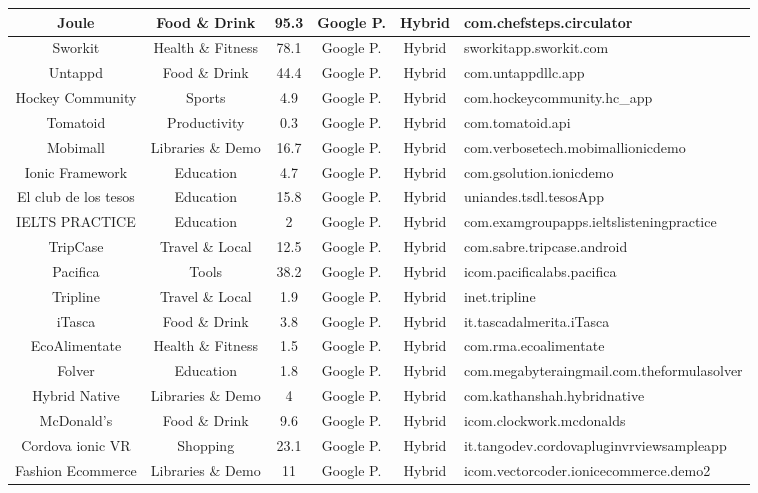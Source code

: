\begin{table}[t]
\begin{adjustbox}{width=\textwidth}
\begin{tabular}{|c|c|c|c|c|l|}
			Joule&Food \& Drink&95.3&Google P.&Hybrid&\small{com.chefsteps.circulator}\\ \hline
			Sworkit&Health \& Fitness&78.1&Google P.&Hybrid&\small{sworkitapp.sworkit.com}\\ \hline
			Untappd &Food \& Drink&44.4&Google P.&Hybrid&\small{com.untappdllc.app}\\ \hline
			Hockey Community&Sports&4.9&Google P.&Hybrid&\small{com.hockeycommunity.hc\_app}\\ \hline
			Tomatoid&Productivity&0.3&Google P.&Hybrid&\small{com.tomatoid.api}\\ \hline
			Mobimall&Libraries \& Demo&16.7&Google P.&Hybrid&\footnotesize{com.verbosetech.mobimall\textunderscore ionicdemo}\\ \hline
			Ionic Framework&Education&4.7&Google P.&Hybrid&\small{com.gsolution.ionicdemo}\\ \hline
			El club de los tesos&Education&15.8&Google P.&Hybrid&\small{uniandes.tsdl.tesosApp}\\ \hline
			IELTS PRACTICE&Education&2&Google P.&Hybrid&\footnotesize{com.examgroupapps.ieltslistening\textunderscore practice}\\ \hline
			TripCase &Travel \& Local&12.5&Google P.&Hybrid&\small{com.sabre.tripcase.android}\\ \hline
			Pacifica&Tools&38.2&Google P.&Hybrid&\small{icom.pacificalabs.pacifica}\\ \hline
			Tripline&Travel \& Local&1.9&Google P.&Hybrid&\small{inet.tripline}\\ \hline
			iTasca&Food \& Drink&3.8&Google P.&Hybrid&\small{it.tascadalmerita.iTasca}\\ \hline
			EcoAlimentate&Health \& Fitness&1.5&Google P.&Hybrid&\small{com.rma.ecoalimentate}\\ \hline
			Folver&Education&1.8&Google P.&Hybrid&\scriptsize{com.megabyteraingmail.com.theformulasolver}\\ \hline
			Hybrid Native&Libraries \& Demo&4&Google P.&Hybrid&\small{com.kathanshah.hybridnative}\\ \hline
			McDonald's &Food \& Drink&9.6&Google P.&Hybrid&\small{icom.clockwork.mcdonalds}\\ \hline
			Cordova ionic VR&Shopping&23.1&Google P.&Hybrid&\footnotesize{it.tangodev.cordovapluginvrviewsampleapp}\\ \hline
			Fashion Ecommerce&Libraries \& Demo&11&Google P.&Hybrid&\footnotesize{icom.vectorcoder.ionicecommerce.demo2}\\ \hline
		\end{tabular}
	\end{adjustbox}
\end{table}



